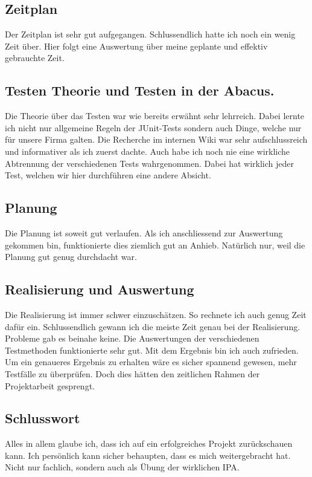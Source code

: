 \subsection{Zeitplan}
Der Zeitplan ist sehr gut aufgegangen. Schlussendlich hatte ich noch ein wenig Zeit über. Hier folgt eine Auswertung über meine geplante und effektiv gebrauchte Zeit.

\subsection{Testen Theorie und Testen in der Abacus.}
Die Theorie über das Testen war wie bereits erwähnt sehr lehrreich. Dabei lernte ich nicht nur allgemeine Regeln der JUnit-Tests sondern auch Dinge, welche nur für unsere Firma galten. Die Recherche im internen Wiki war sehr aufschlussreich und informativer als ich zuerst dachte. Auch habe ich noch nie eine wirkliche Abtrennung der verschiedenen Tests wahrgenommen. Dabei hat wirklich jeder Test, welchen wir hier durchführen eine andere Absicht.
\subsection{Planung}
Die Planung ist soweit gut verlaufen. Als ich anschliessend zur Auswertung gekommen bin, funktionierte dies ziemlich gut an Anhieb. Natürlich nur, weil die Planung gut genug durchdacht war.
\subsection{Realisierung und Auswertung}
Die Realisierung ist immer schwer einzuschätzen. So rechnete ich auch genug Zeit dafür ein. Schlussendlich gewann ich die meiste Zeit genau bei der Realisierung. Probleme gab es beinahe keine. Die Auswertungen der verschiedenen Testmethoden funktionierte sehr gut. Mit dem Ergebnis bin ich auch zufrieden. Um ein genaueres Ergebnis zu erhalten wäre es sicher spannend gewesen, mehr Testfälle zu überprüfen. Doch dies hätten den zeitlichen Rahmen der Projektarbeit gesprengt.
\subsection{Schlusswort}
Alles in allem glaube ich, dass ich auf ein erfolgreiches Projekt zurückschauen kann. Ich persönlich kann sicher behaupten, dass es mich weitergebracht hat. Nicht nur fachlich, sondern auch als Übung der wirklichen IPA.








